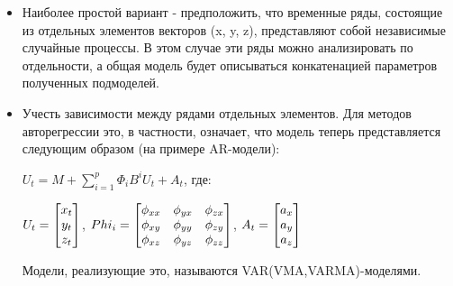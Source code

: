 \begin{itemize}
\item Наиболее простой вариант - предположить, что временные ряды, состоящие из отдельных элементов векторов (x, y, z), представляют собой независимые случайные процессы. В этом случае эти ряды можно анализировать по отдельности, а общая модель будет описываться конкатенацией параметров полученных подмоделей.
\item Учесть зависимости между рядами отдельных элементов. Для методов авторегрессии это, в частности, означает, что модель теперь представляется следующим образом (на примере AR-модели):

$U_t=M+\sum_{i=1}^p \Phi_iB^i U_t + A_t$,  где:

 $U_t=\begin{bmatrix} x_t \\ y_t \\ z_t \\ \end{bmatrix}$, $Phi_i=\begin{bmatrix} \phi_{xx} & \phi_{yx} & \phi_{zx} \\ \phi_{xy} & \phi_{yy} & \phi_{zy} \\ \phi_{xz} & \phi_{yz} & \phi_{zz} \\ \end{bmatrix}$, 
 $A_t=\begin{bmatrix} a_x \\ a_y \\ a_z \\ \end{bmatrix}$

Модели, реализующие это, называются VAR(VMA,VARMA)-моделями. 
\end{itemize}



